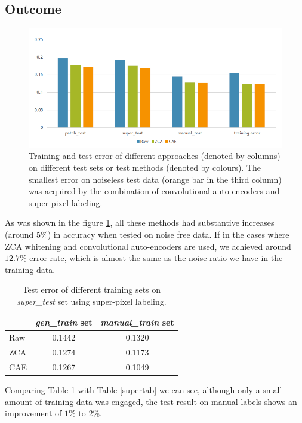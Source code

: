 \subsection{Outcome}
\begin{figure}[h!]
\centering
\includegraphics[width=\linewidth]{pics/res.png}
\caption{Training and test error of different approaches (denoted by columns) on different test sets or test methods (denoted by colours). The smallest error on noiseless test data (orange bar in the third column) was acquired by the combination of convolutional auto-encoders and super-pixel labeling.}
\label{resfig}
\end{figure}

As was shown in the figure \ref{resfig}, all these methods had substantive increases (around $5\%$) in accuracy when tested on noise free data. If in the cases where ZCA whitening and convolutional auto-encoders are used, we achieved around $12.7\%$ error rate, which is almost the same as the noise ratio we have in the training data.

\begin{table}[h!]
	\centering		
	\begin{tabular}{lcc}	
				& \textit{gen\_train} set & \textit{manual\_train} set\\
	\hline
	Raw 			& 0.1442 & 0.1320 \\
	ZCA			& 0.1274 & 0.1173 \\
	CAE			& 0.1267 & 0.1049 \\	
	\end{tabular}	
	\caption{Test error of different training sets on \textit{super\_test} set using super-pixel labeling.}
	\label{mantab}
\end{table}

Comparing Table \ref{mantab} with Table \ref{supertab} we can see, although only a small amount of training data was engaged, the test result on manual labels shows an improvement of $1\%$ to $2\%$.

